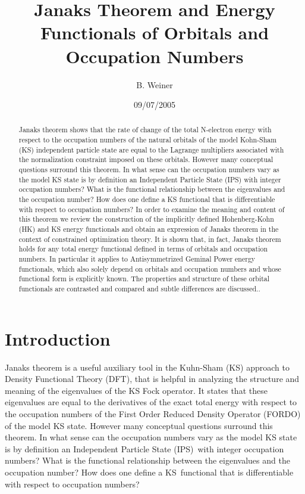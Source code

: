 \documentclass[aps,preprint]{revtex4}%
\begin{document}
\preprint{ }
\title[Janaks Theorem]{Janaks Theorem and Energy Functionals of Orbitals and Occupation Numbers}
\author{B. Weiner}
\keywords{}
\pacs{}

\begin{abstract}
Janaks theorem shows that the rate of change of the total N-electron energy
with respect to the occupation numbers of the natural orbitals of the model
Kohn-Sham (KS) independent particle state are equal to the Lagrange
multipliers associated with the normalization constraint imposed on these
orbitals. However many conceptual questions surround this theorem. In what
sense can the occupation numbers vary as the model KS state is by definition
an Independent Particle State (IPS) with integer occupation numbers? What is
the functional relationship between the eigenvalues and the occupation number?
How does one define a KS functional that is differentiable with respect to
occupation numbers? In order to examine the meaning and content of this
theorem we review the construction of the implicitly defined Hohenberg-Kohn
(HK) and KS energy functionals and obtain an expression of Janaks theorem in
the context of constrained optimization theory. It is shown that, in fact,
Janaks theorem holds for any total energy functional defined in terms of
orbitals and occupation numbers. In particular it applies to Antisymmetrized
Geminal Power energy functionals, which also solely depend on orbitals and
occupation numbers and whose functional form is explicitly known. The
properties and structure of these orbital functionals are contrasted and
compared and subtle differences are discussed..\qquad

\end{abstract}
\date{09/07/2005}
\maketitle
\tableofcontents


\section{ Introduction\label{Intro}}

Janaks theorem is a useful auxiliary tool in the Kuhn-Sham (KS) approach to
Density Functional Theory (DFT), that is helpful in analyzing the structure
and meaning of the eigenvalues of the KS Fock operator. It states that these
eigenvalues are equal to the derivatives of the exact total energy with
respect to the occupation numbers of the First Order Reduced Density Operator
(FORDO) of the model KS state. However many conceptual questions surround this
theorem. In what sense can the occupation numbers vary as the model KS state
is by definition an Independent Particle State (IPS)\ with integer occupation
numbers? What is the functional relationship between the eigenvalues and the
occupation number? How does one define a KS\ functional that is differentiable
with respect to occupation numbers?
\end{document}
